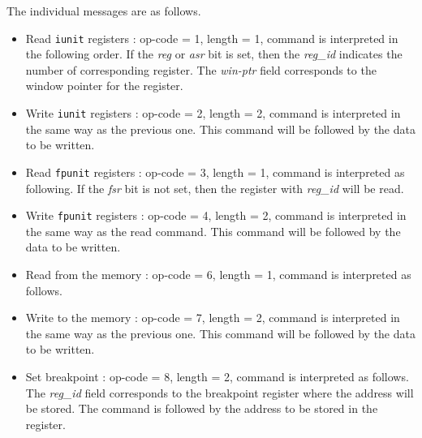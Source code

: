 \documentclass[a4paper, 11pt]{article}
\begin{document}
The individual messages are as follows.
\begin{itemize}
		\item Read \texttt{iunit} registers : op-code = 1, length = 1, command is interpreted in the following order. If the \textit{reg} or \textit{asr} bit is set, then the \textit{reg\_id} indicates the number of corresponding register. The \textit{win-ptr} field corresponds to the window pointer for the register.
		
		\begin{figure}[h!]
			\centering
		\end{figure}
		
		\item Write \texttt{iunit} registers : op-code = 2, length = 2, command is interpreted in the same way as the previous one. This command will be followed by the data to be written.
		
		\item Read \texttt{fpunit} registers : op-code = 3, length = 1, command is interpreted as following. If the \textit{fsr} bit is not set, then the register with \textit{reg\_id} will be read.
		
		\begin{figure}[h!]
			\centering
		\end{figure}
				
		\item Write \texttt{fpunit} registers : op-code = 4, length = 2, command is interpreted in the same way as the read command. This command will be followed by the data to be written.
		
		\item Read from the memory : op-code = 6, length = 1, command is interpreted as follows.
		
		\begin{figure}[h!]
			\centering
		\end{figure}
		
		\item Write to the memory : op-code = 7, length = 2, command is interpreted in the same way as the previous one. This command will be followed by the data to be written.
		
		\item Set breakpoint : op-code = 8, length = 2, command is interpreted as follows. The \textit{reg\_id} field corresponds to the breakpoint register where the address will be stored. The command is followed by the address to be stored in the register.
		

\end{itemize}
\end{document}
